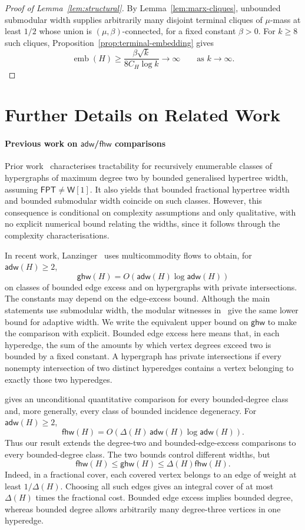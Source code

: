 \documentclass[11pt,letterpaper]{article}
\theoremstyle{definition}
\theoremstyle{remark}
\newcommand{\ghw}{\mathsf{ghw}}
\newcommand{\fhw}{\mathsf{fhw}}
\newcommand{\adw}{\mathsf{adw}}
\newcommand{\FPT}{\ensuremath{\mathsf{FPT}}}
\newcommand{\emb}{\operatorname{emb}}
\newcommand{\wone}{\ensuremath{\mathsf{W}[1]}}
\providecommand{\adw}{\operatorname{adw}}
\providecommand{\fhw}{\operatorname{fhw}}
\providecommand{\FPT}{\ensuremath{\mathsf{FPT}}}
\begin{document}
\begin{proof}[Proof of Lemma~\ref{lem:structural}]
By Lemma~\ref{lem:marx-cliques}, unbounded submodular width supplies
arbitrarily many disjoint terminal cliques of $\mu$-mass at least $1/2$
whose union is $(\mu,\beta)$-connected, for a fixed constant $\beta>0$.
For $k\ge8$ such cliques,
Proposition~\ref{prop:terminal-embedding} gives
\[
 \emb(H)\ge\frac{\beta\sqrt{k}}{8C_H\log k}
 \longrightarrow\infty\qquad\text{as }k\to\infty.
\]
\end{proof}


%
\section{Further Details on Related Work}
\label{sec:related-work}
\paragraph{Previous work on $\adw$/$\fhw$ comparisons}
Prior work~\cite{LanzingerPODS22} characterises tractability for recursively
enumerable classes of hypergraphs of maximum degree two by bounded
generalised hypertree width, assuming $\FPT\ne \wone$.
It also yields that bounded fractional hypertree width and bounded
submodular width coincide on such classes. However, this consequence is
conditional on complexity assumptions and only qualitative, with no
explicit numerical bound relating the widths, since it follows through
the complexity characterisations.

In recent work, Lanzinger~\cite{Lanzinger2026Cuts} uses multicommodity
flows to obtain, for $\adw(H)\ge2$,
\[
 \ghw(H)=O\!\left(\adw(H)\log\adw(H)\right)
\]
on classes of bounded edge excess and on hypergraphs with private
intersections. The constants may depend on the edge-excess bound.
Although the main statements use submodular width, the modular
witnesses in~\cite[Section~6.1]{Lanzinger2026Cuts} give the same lower
bound for adaptive width. We write the equivalent upper bound on
$\ghw$ to make the comparison with  explicit.
Bounded edge excess here means that, in each hyperedge, the
sum of the amounts by which vertex degrees exceed two is bounded by a
fixed constant. A hypergraph has private intersections if every nonempty
intersection of two distinct hyperedges contains a vertex belonging to
exactly those two hyperedges.

 gives an unconditional quantitative comparison
for every bounded-degree class and, more generally, every class of
bounded incidence degeneracy. For $\adw(H)\ge2$,
\[
 \fhw(H)=O\!\left(\Delta(H)\,\adw(H)\log\adw(H)\right).
\]
Thus our result extends the degree-two and bounded-edge-excess
comparisons to every bounded-degree class. The two bounds control
different widths, but
\[
 \fhw(H)\le\ghw(H)\le\Delta(H)\fhw(H).
\]
Indeed, in a fractional cover, each covered vertex belongs to an edge
of weight at least $1/\Delta(H)$. Choosing all such edges gives an
integral cover of at most $\Delta(H)$ times the fractional cost.
Bounded edge excess implies bounded degree, whereas bounded degree
allows arbitrarily many degree-three vertices in one hyperedge.
\end{document}
